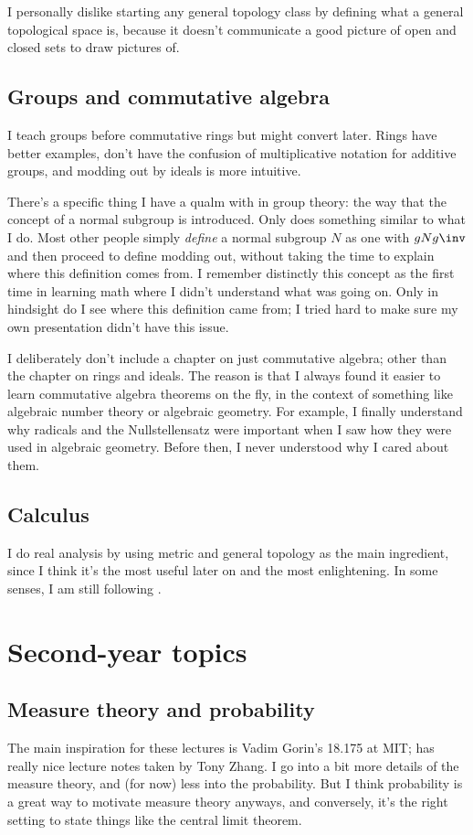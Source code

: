 I personally dislike starting any general topology class
by defining what a general topological space is,
because it doesn't communicate a good picture of open and closed sets
to draw pictures of.

\subsection{Groups and commutative algebra}
I teach groups before commutative rings but might convert later.
Rings have better examples, don't have the confusion of multiplicative
notation for additive groups, and modding out by ideals is more intuitive.

There's a specific thing I have a qualm with in group theory:
the way that the concept of a normal subgroup is introduced.
Only \cite{ref:gowers} does something similar to what I do.
Most other people simply \emph{define} a normal subgroup $N$
as one with $gNg\inv$ and then proceed to define modding out,
without taking the time to explain where this definition comes from.
I remember distinctly this concept as the first time in learning math
where I didn't understand what was going on.
Only in hindsight do I see where this definition came from;
I tried hard to make sure my own presentation didn't have this issue.

I deliberately don't include a chapter on just commutative algebra;
other than the chapter on rings and ideals.
The reason is that I always found it easier to learn
commutative algebra theorems on the fly,
in the context of something like algebraic number theory or algebraic geometry.
For example, I finally understand why radicals and the Nullstellensatz were important
when I saw how they were used in algebraic geometry.
Before then, I never understood why I cared about them.

\subsection{Calculus}
I do real analysis by using metric and general topology
as the main ingredient, since I think it's the most useful
later on and the most enlightening.
In some senses, I am still following \cite{ref:pugh}.

\section{Second-year topics}
\subsection{Measure theory and probability}
The main inspiration for these lectures is
Vadim Gorin's 18.175 at MIT;
\cite{ref:gorin} has really nice lecture notes taken by Tony Zhang.
I go into a bit more details of the measure theory,
and (for now) less into the probability.
But I think probability is a great way to motivate measure theory anyways,
and conversely, it's the right setting to state things like
the central limit theorem.

